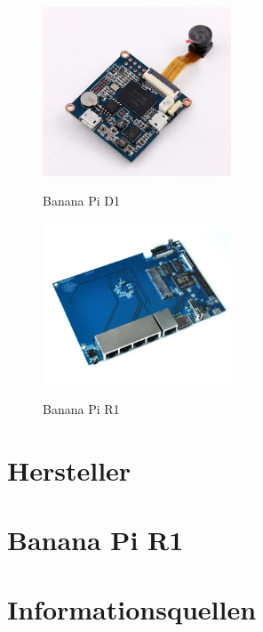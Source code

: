 \begin{figure}[!htbp]
\caption{Banana Pi D1}
\includegraphics[width=0.5\textwidth]{content/pictures/bpid1.jpg}
\label{pic:bpid1}
\end{figure}
\begin{figure}[!htbp]
\caption{Banana Pi R1}
\includegraphics[width=0.5\textwidth]{content/pictures/bpir1.jpg}
\label{pic:bpir1}
\end{figure}

\section{Hersteller}


\section{Banana Pi R1}


\section{Informationsquellen}
